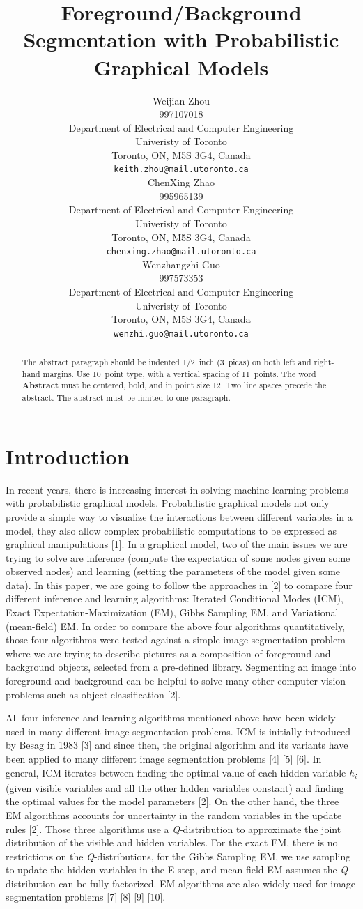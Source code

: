 \documentclass{article} %
\title{Foreground/Background Segmentation with Probabilistic Graphical Models}
\author{
Weijian Zhou \\
997107018 \\
Department of Electrical and Computer Engineering\\
Univeristy of Toronto\\
Toronto, ON, M5S 3G4, Canada \\
\texttt{keith.zhou@mail.utoronto.ca} \\
\And
ChenXing Zhao \\
995965139 \\
Department of Electrical and Computer Engineering\\
Univeristy of Toronto\\
Toronto, ON, M5S 3G4, Canada \\
\texttt{chenxing.zhao@mail.utoronto.ca} \\
\AND
Wenzhangzhi Guo \\
997573353 \\
Department of Electrical and Computer Engineering\\
Univeristy of Toronto\\
Toronto, ON, M5S 3G4, Canada \\
\texttt{wenzhi.guo@mail.utoronto.ca} \\
}
\begin{document}
\maketitle

\begin{abstract}
The abstract paragraph should be indented 1/2~inch (3~picas) on both left and
right-hand margins. Use 10~point type, with a vertical spacing of 11~points.
The word \textbf{Abstract} must be centered, bold, and in point size 12. Two
line spaces precede the abstract. The abstract must be limited to one
paragraph.
\end{abstract}

\section{Introduction}
\label{intro}
In recent years, there is increasing interest in solving machine learning problems with probabilistic graphical models. Probabilistic graphical models not only provide a simple way to visualize the interactions between different variables in a model, they also allow complex probabilistic computations to be expressed as graphical manipulations [1]. In a graphical model, two of the main issues we are trying to solve are inference (compute the expectation of some nodes given some observed nodes) and learning (setting the parameters of the model given some data). In this paper, we are going to follow the approaches in [2] to compare four different inference and learning algorithms: Iterated Conditional Modes (ICM), Exact Expectation-Maximization (EM), Gibbs Sampling EM, and Variational (mean-field) EM. In order to compare the above four algorithms quantitatively, those four algorithms were tested against a simple image segmentation problem where we are trying to describe pictures as a composition of foreground and background objects, selected from a pre-defined library. Segmenting an image into foreground and background can be helpful to solve many other computer vision problems such as object classification [2].

All four inference and learning algorithms mentioned above have been widely used in many different image segmentation problems. ICM is initially introduced by Besag in 1983 [3] and since then, the original algorithm and its variants have been applied to many different image segmentation problems [4] [5] [6]. In general, ICM iterates between finding the optimal value of each hidden variable \textit{h}\textsubscript{\textit{i}} (given visible variables and all the other hidden variables constant) and finding the optimal values for the model parameters [2]. On the other hand, the three EM algorithms accounts for uncertainty in the random variables in the update rules [2]. Those three algorithms use a \textit{Q}-distribution to approximate the joint distribution of the visible and hidden variables. For the exact EM, there is no restrictions on the \textit{Q}-distributions, for the Gibbs Sampling EM, we use sampling to update the hidden variables in the E-step, and mean-field EM assumes the \textit{Q}-distribution can be fully factorized. EM algorithms are also widely used for image segmentation problems [7] [8] [9] [10].
\end{document}
